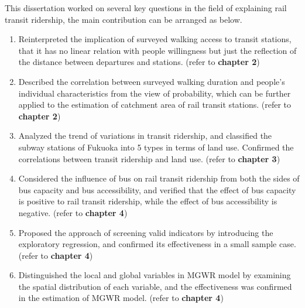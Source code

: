 This dissertation worked on several key questions in the field of explaining rail transit ridership, the main contribution can be arranged as below.

\begin{enumerate}
	\item Reinterpreted the implication of surveyed walking access to transit stations, that it has no linear relation with people willingness but just the reflection of the distance between departures and stations. (refer to \textbf{chapter 2})
	
	\item Described the correlation between surveyed walking duration and people's individual characteristics from the view of probability, which can be further applied to the estimation of catchment area of rail transit stations. (refer to \textbf{chapter 2})
	
	\item Analyzed the trend of variations in transit ridership, and classified the subway stations of Fukuoka into 5 types in terms of land use. Confirmed the correlations between transit ridership and land use. (refer to \textbf{chapter 3})
	
	\item Considered the influence of bus on rail transit ridership from both the sides of bus capacity and bus accessibility, and verified that the effect of bus capacity is positive to rail transit ridership, while the effect of bus accessibility is negative. (refer to \textbf{chapter 4})
	
	\item Proposed the approach of screening valid indicators by introducing the exploratory regression, and confirmed its effectiveness in a small sample case. (refer to \textbf{chapter 4})
	
	\item Distinguished the local and global variables in MGWR model by examining the spatial distribution of each variable, and the effectiveness was confirmed in the estimation of MGWR model. (refer to \textbf{chapter 4})
	

\end{enumerate}
